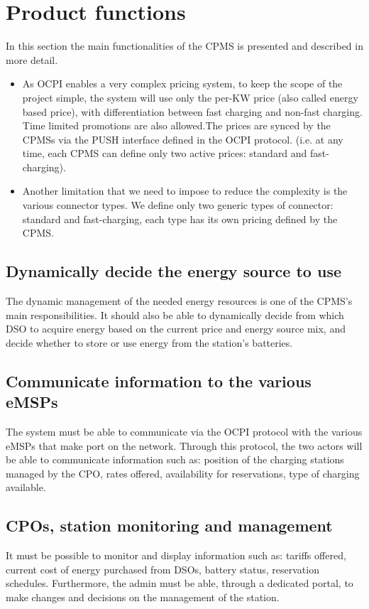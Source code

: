 \clearpage
\newpage


\section{Product functions}
In this section the main functionalities of the CPMS is presented and described in more detail.\\

\begin{itemize}
	\item As OCPI enables a very complex pricing system, to keep the scope of the project simple, the system will use only the per-KW price (also called energy based price), with differentiation between fast charging and non-fast charging. Time limited promotions are also allowed.The prices are synced by the CPMSs via the PUSH interface defined in the OCPI protocol. (i.e. at any time, each CPMS can define only two active prices: standard and fast-charging). 
	\item Another limitation that we need to impose to reduce the complexity is the various connector types. We define only two generic types of connector: standard and fast-charging, each type has its own pricing defined by the CPMS.
\end{itemize}

\subsection{Dynamically decide the energy source to use}
The dynamic management of the needed energy resources is one of the CPMS's main responsibilities. It should also be able to dynamically decide from which DSO to acquire energy based on the current price and energy source mix, and decide whether to store or use energy from the station's batteries. 

\subsection{Communicate information to the various eMSPs}
The system must be able to communicate via the OCPI protocol with the various eMSPs that make port on the network. Through this protocol, the two actors will be able to communicate information such as: position of the charging stations managed by the CPO, rates offered, availability for reservations, type of charging available. \\

\subsection{CPOs, station monitoring and management}
It must be possible to monitor and display information such as: tariffs offered, current cost of energy purchased from DSOs, battery status, reservation schedules. Furthermore, the admin must be able, through a dedicated portal, to make changes and decisions on the management of the station.

